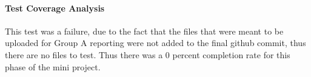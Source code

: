 \paragraph{Test Coverage Analysis}
This test was a failure, due to the fact that the files that were meant to be uploaded for Group A reporting were not added to the final github commit, thus there are no files to test. 
Thus there was a 0 percent completion rate for this phase of the mini project.

		